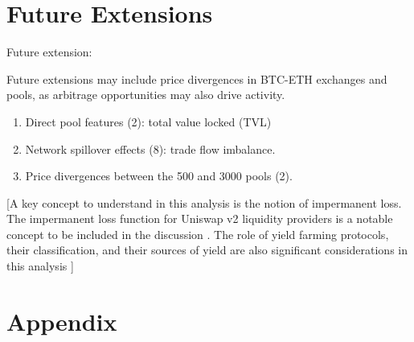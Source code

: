 \documentclass{article}
\begin{document}

\section{\textbf{Future Extensions}}
Future extension:

Future extensions may include price divergences in BTC-ETH exchanges and pools, as arbitrage opportunities may also drive activity.

\begin{enumerate}[label=\arabic*. ,itemsep=0pt, topsep=0pt]
\item Direct pool features (2): total value locked (TVL)
\item Network spillover effects (8): trade flow imbalance.
\item Price divergences between the 500 and 3000 pools (2).
\end{enumerate}

[A key concept to understand in this analysis is the notion of impermanent loss. The impermanent loss function for Uniswap v2 liquidity providers is a notable concept to be included in the discussion \cite{Aigner2021}. The role of yield farming protocols, their classification, and their sources of yield are also significant considerations in this analysis \cite{Xu2023}]

\section{Appendix}
\end{document}
